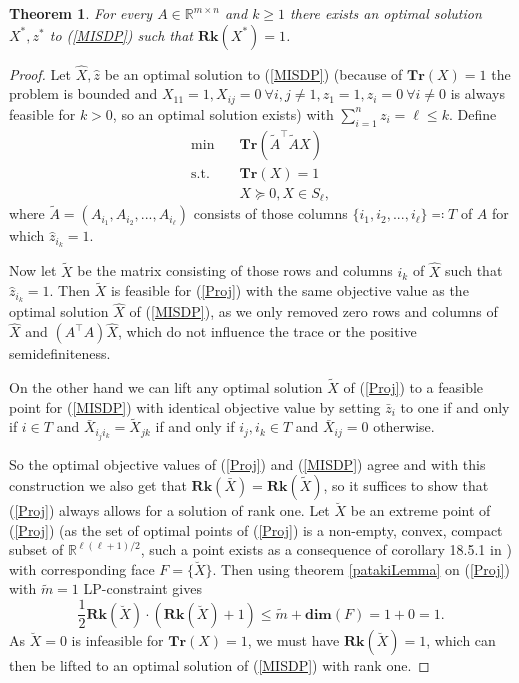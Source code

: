 \documentclass[a4paper,11pt,1p]{elsarticle}
\newtheorem{thm}{Theorem}
\newcommand{\enifed}{\eqqcolon}
\newcommand{\T}{^{\top}}
\newcommand{\Tr}{\textbf{Tr}}
\newcommand{\Rk}{\textbf{Rk}}
\newcommand{\R}{\mathds{R}}
\begin{document}
\begin{thm}\label{Rk1thm}
 For every $A \in \R^{m \times n}$ and $k \geq 1$ there exists an optimal solution $X^*, z^*$ to (\ref{MISDP}) such that $\Rk(X^*) = 1$. 
\end{thm}
\begin{proof}
 Let $\hat{X}, \hat{z}$ be an optimal solution to (\ref{MISDP}) (because of $\Tr(X) = 1$ the problem is bounded and $X_{11} = 1, X_{ij} = 0 \ \forall i,j \neq 1, z_1 = 1, z_i = 0 \ \forall i \neq 0$ is always feasible for $k > 0$,
 so an optimal solution exists)
 with $\sum_{i=1}^n z_i = \ell \leq k$. Define
 \begin{align}\label{Proj}
 \min \quad & \Tr(\tilde{A}\T\tilde{A}X) \nonumber \\
 \text{s.t.} \quad & \Tr(X) = 1 \tag{Proj} \\
 & X \succeq 0 , X \in S_\ell, \nonumber
 \end{align}
where $\tilde{A} = (A_{i_1}, A_{i_2}, ..., A_{i_\ell})$ consists of those
columns $\{{i_1}, {i_2}, ..., {i_\ell}\} \enifed T$ of $A$ for which
$\hat{z}_{i_k} = 1$.

Now let $\tilde{X}$ be the matrix consisting of those rows and columns 
$i_k$ of $\hat{X}$ such that $\hat{z}_{i_k} = 1$. Then $\tilde{X}$ is feasible for (\ref{Proj}) with the same objective value as the optimal solution $\hat{X}$ of (\ref{MISDP}), as we only removed zero rows and columns of $\hat{X}$ 
and $(A\T A)\hat{X}$, which do not influence the trace or the positive
semidefiniteness.

On the other hand we can lift any optimal solution $\tilde{X}$ of (\ref{Proj}) to a feasible point for (\ref{MISDP}) with identical objective value by setting $\bar{z}_i$ to one if and only if $i \in T$
and $\bar{X}_{i_j i_k} = \tilde{X}_{jk}$ if and only if $i_j, i_k \in T$
and $\bar{X}_{ij}=0$ otherwise.

So the optimal objective values of (\ref{Proj}) and (\ref{MISDP}) agree and with this construction we also get that 
$\Rk(\bar{X}) = \Rk(\tilde{X})$, so it suffices to show that (\ref{Proj}) always allows for a solution of rank one.
Let $\breve{X}$ be an extreme point of (\ref{Proj}) (as the set of optimal points of (\ref{Proj}) is a non-empty, convex, compact subset of $\R^{\ell(\ell+1)/2}$, such a point exists as a consequence of corollary 18.5.1 in
\cite{Roc70}) with corresponding face $F=\{\breve{X}\}$. Then using theorem \ref{patakiLemma} on (\ref{Proj}) with $\tilde{m} = 1$ LP-constraint gives
\begin{equation*}
 \frac{1}{2}\Rk(\breve{X})\cdot(\Rk(\breve{X})+1) \leq \tilde{m} + \textbf{dim}(F) = 1 + 0 = 1.
\end{equation*}
As $\breve{X}=0$ is infeasible for $\Tr(X)=1$, we must have $\Rk(\breve{X}) = 1$, which can then be lifted to an optimal solution of (\ref{MISDP}) with rank one.
\end{proof}
\end{document}
